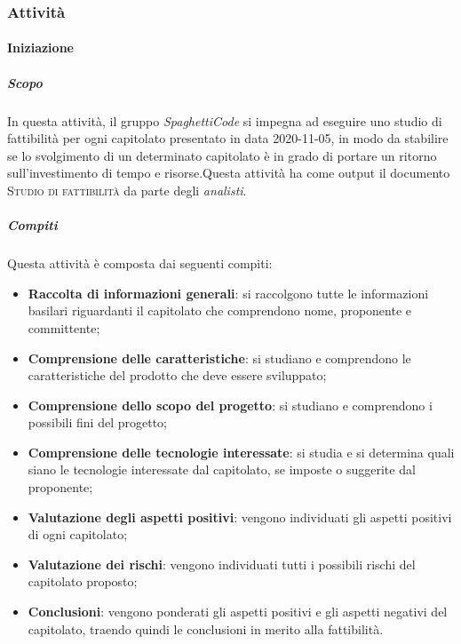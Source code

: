 \subsubsection{Attività}

\paragraph{Iniziazione}
\label{par:iniziazione}
\subparagraph{Scopo}
\label{par:iniziazione:scopo}
In questa attività, il gruppo \emph{SpaghettiCode} si impegna ad eseguire uno studio di fattibilità per ogni capitolato presentato in data 2020-11-05, in modo da stabilire se lo svolgimento di un determinato capitolato è in grado di portare un ritorno sull'investimento di tempo e risorse.Questa attività ha come output il documento \textsc{Studio di fattibilità} da parte degli \emph{analisti}.\\
\subparagraph{Compiti}
\label{par:iniziazione:compiti}
Questa attività è composta dai seguenti compiti:
\begin{itemize}
    \item \textbf{Raccolta di informazioni generali}: si raccolgono tutte le informazioni basilari riguardanti il
    capitolato che comprendono nome, proponente e committente;
    \item \textbf{Comprensione delle caratteristiche}: si studiano e comprendono le caratteristiche del prodotto che
    deve essere sviluppato;
    \item \textbf{Comprensione dello scopo del progetto}: si studiano e comprendono i possibili fini del progetto;
    \item \textbf{Comprensione delle tecnologie interessate}: si studia e si determina quali siano le tecnologie
    interessate dal capitolato, se imposte o suggerite dal proponente;
    \item \textbf{Valutazione degli aspetti positivi}: vengono individuati gli aspetti positivi di ogni capitolato;
    \item \textbf{Valutazione dei rischi}: vengono individuati tutti i possibili rischi del capitolato proposto;
    \item \textbf{Conclusioni}: vengono ponderati gli aspetti positivi e gli aspetti negativi del capitolato, traendo
        quindi le conclusioni in merito alla fattibilità.
\end{itemize}

